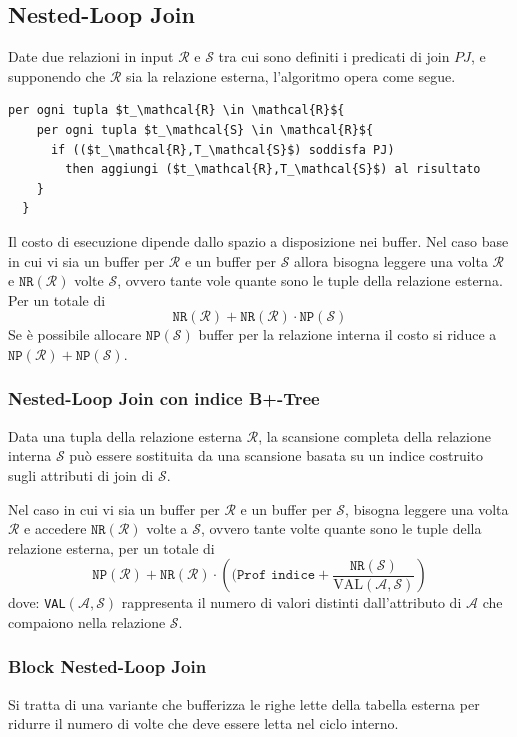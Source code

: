 \documentclass[oneside,a4paper,11pt]{book}
\theoremstyle{italicstyle}
\theoremstyle{normStyle}
\begin{document}
\subsection{Nested-Loop Join}
Date due relazioni in input $\mathcal{R}$ e $\mathcal{S}$ tra cui sono definiti i predicati di join 
$PJ$, e supponendo che $\mathcal{R}$ sia la relazione esterna, l'algoritmo opera come segue.
\begin{lstlisting}[mathescape]
  per ogni tupla $t_\mathcal{R} \in \mathcal{R}${
    per ogni tupla $t_\mathcal{S} \in \mathcal{R}${
      if (($t_\mathcal{R},T_\mathcal{S}$) soddisfa PJ)
        then aggiungi ($t_\mathcal{R},T_\mathcal{S}$) al risultato
    }
  }
\end{lstlisting}
Il costo di esecuzione dipende dallo spazio a disposizione nei buffer.
Nel caso base in cui vi sia un buffer per $\mathcal{R}$ e un buffer per $\mathcal{S}$
allora bisogna leggere una volta $\mathcal{R}$ e $\texttt{NR}(\mathcal{R})$ volte $\mathcal{S}$,
ovvero tante vole quante sono le tuple della relazione esterna.
Per un totale di 
\[
  \texttt{NR}(\mathcal{R}) + \texttt{NR}(\mathcal{R}) \cdot \texttt{NP}(\mathcal{S})
\]
Se è possibile allocare $\texttt{NP}(\mathcal{S})$ buffer per la relazione interna il costo si riduce a 
$\texttt{NP}(\mathcal{R}) + \texttt{NP}(\mathcal{S})$.
\subsubsection{Nested-Loop Join con indice B+-Tree}
Data una tupla della relazione esterna $\mathcal{R}$, la scansione completa della relazione interna 
$\mathcal{S}$ può essere sostituita da una scansione basata su un indice costruito sugli attributi 
di join di $\mathcal{S}$.

Nel caso in cui vi sia un buffer per $\mathcal{R}$ e un buffer per $\mathcal{S}$, bisogna 
leggere una volta $\mathcal{R}$ e accedere $\texttt{NR}(\mathcal{R})$ volte a $\mathcal{S}$, 
ovvero tante volte quante sono le tuple della relazione esterna, per un totale di 
\[
  \texttt{NP}(\mathcal{R}) + \texttt{NR}(\mathcal{R}) \cdot \left((\texttt{Prof indice} + \frac{\texttt{NR}(\mathcal{S})}{\text{VAL}(\mathcal{A}, \mathcal{S})}\right)
\]
dove: \verb|VAL|$(\mathcal{A}, \mathcal{S})$ rappresenta il numero di valori distinti dall'attributo di $\mathcal{A}$
che compaiono nella relazione $\mathcal{S}$.
\subsubsection{Block Nested-Loop Join}
Si tratta di una variante che bufferizza le righe lette della tabella esterna per ridurre il numero 
di volte che deve essere letta nel ciclo interno.
\end{document}
